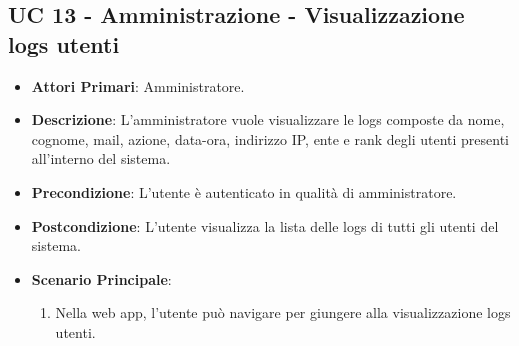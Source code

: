 		



		



		


		\subsection{UC 13 - Amministrazione - Visualizzazione logs utenti}
		\begin{itemize}
			\item \textbf{Attori Primari}: Amministratore.
			\item \textbf{Descrizione}: L'amministratore vuole visualizzare le logs composte da nome, cognome, mail, azione, data-ora, indirizzo IP, ente e rank degli utenti presenti all'interno del sistema.
			\item \textbf{Precondizione}: L'utente è autenticato in qualità di amministratore.
			\item \textbf{Postcondizione}: L'utente visualizza la lista delle logs di tutti gli utenti del sistema.
			\item \textbf{Scenario Principale}:
			\begin{enumerate}
				\item Nella web app, l'utente può navigare per giungere alla visualizzazione logs utenti.
			\end{enumerate}	
		\end{itemize}

